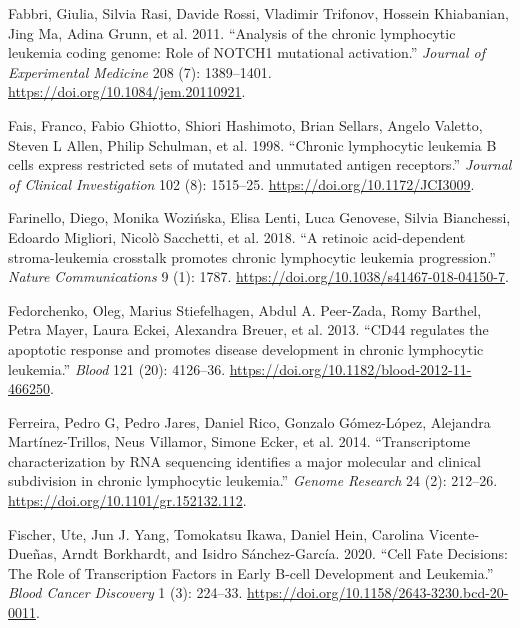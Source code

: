\documentclass[11pt, a4paper, twosided]{book}
\newenvironment{CSLReferences}%
  {}%
  {\par}
\begin{document}
\begin{CSLReferences}{1}{0}
\leavevmode{}%
Fabbri, Giulia, Silvia Rasi, Davide Rossi, Vladimir Trifonov, Hossein Khiabanian, Jing Ma, Adina Grunn, et al. 2011. {``{Analysis of the chronic lymphocytic leukemia coding genome: Role of NOTCH1 mutational activation}.''} \emph{Journal of Experimental Medicine} 208 (7): 1389--1401. \url{https://doi.org/10.1084/jem.20110921}.

\leavevmode{}%
Fais, Franco, Fabio Ghiotto, Shiori Hashimoto, Brian Sellars, Angelo Valetto, Steven L Allen, Philip Schulman, et al. 1998. {``{Chronic lymphocytic leukemia B cells express restricted sets of mutated and unmutated antigen receptors}.''} \emph{Journal of Clinical Investigation} 102 (8): 1515--25. \url{https://doi.org/10.1172/JCI3009}.

\leavevmode{}%
Farinello, Diego, Monika Wozińska, Elisa Lenti, Luca Genovese, Silvia Bianchessi, Edoardo Migliori, Nicolò Sacchetti, et al. 2018. {``{A retinoic acid-dependent stroma-leukemia crosstalk promotes chronic lymphocytic leukemia progression}.''} \emph{Nature Communications} 9 (1): 1787. \url{https://doi.org/10.1038/s41467-018-04150-7}.

\leavevmode{}%
Fedorchenko, Oleg, Marius Stiefelhagen, Abdul A. Peer-Zada, Romy Barthel, Petra Mayer, Laura Eckei, Alexandra Breuer, et al. 2013. {``{CD44 regulates the apoptotic response and promotes disease development in chronic lymphocytic leukemia}.''} \emph{Blood} 121 (20): 4126--36. \url{https://doi.org/10.1182/blood-2012-11-466250}.

\leavevmode{}%
Ferreira, Pedro G, Pedro Jares, Daniel Rico, Gonzalo Gómez-López, Alejandra Martínez-Trillos, Neus Villamor, Simone Ecker, et al. 2014. {``{Transcriptome characterization by RNA sequencing identifies a major molecular and clinical subdivision in chronic lymphocytic leukemia}.''} \emph{Genome Research} 24 (2): 212--26. \url{https://doi.org/10.1101/gr.152132.112}.

\leavevmode{}%
Fischer, Ute, Jun J. Yang, Tomokatsu Ikawa, Daniel Hein, Carolina Vicente-Dueñas, Arndt Borkhardt, and Isidro Sánchez-García. 2020. {``{Cell Fate Decisions: The Role of Transcription Factors in Early B-cell Development and Leukemia}.''} \emph{Blood Cancer Discovery} 1 (3): 224--33. \url{https://doi.org/10.1158/2643-3230.bcd-20-0011}.


\end{CSLReferences}
\end{document}
